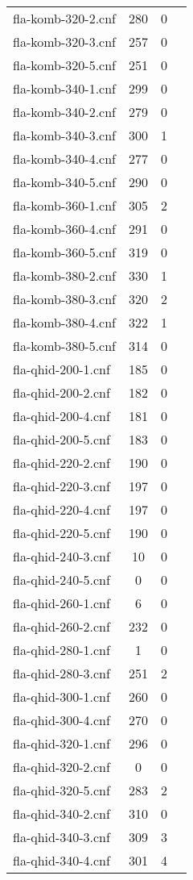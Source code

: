 \begin{table}[h!]
\begin{tabular}{l| c c c }
fla-komb-320-2.cnf & 280 & 0 \\
fla-komb-320-3.cnf & 257 & 0 \\
fla-komb-320-5.cnf & 251 & 0 \\
fla-komb-340-1.cnf & 299 & 0 \\
fla-komb-340-2.cnf & 279 & 0 \\
fla-komb-340-3.cnf & 300 & 1 \\
fla-komb-340-4.cnf & 277 & 0 \\
fla-komb-340-5.cnf & 290 & 0 \\
fla-komb-360-1.cnf & 305 & 2 \\
fla-komb-360-4.cnf & 291 & 0 \\
fla-komb-360-5.cnf & 319 & 0 \\
fla-komb-380-2.cnf & 330 & 1 \\
fla-komb-380-3.cnf & 320 & 2 \\
fla-komb-380-4.cnf & 322 & 1 \\
fla-komb-380-5.cnf & 314 & 0 \\
fla-qhid-200-1.cnf & 185 & 0 \\
fla-qhid-200-2.cnf & 182 & 0 \\
fla-qhid-200-4.cnf & 181 & 0 \\
fla-qhid-200-5.cnf & 183 & 0 \\
fla-qhid-220-2.cnf & 190 & 0 \\
fla-qhid-220-3.cnf & 197 & 0 \\
fla-qhid-220-4.cnf & 197 & 0 \\
fla-qhid-220-5.cnf & 190 & 0 \\
fla-qhid-240-3.cnf & 10 & 0 \\
fla-qhid-240-5.cnf & 0 & 0 \\
fla-qhid-260-1.cnf & 6 & 0 \\
fla-qhid-260-2.cnf & 232 & 0 \\
fla-qhid-280-1.cnf & 1 & 0 \\
fla-qhid-280-3.cnf & 251 & 2 \\
fla-qhid-300-1.cnf & 260 & 0 \\
fla-qhid-300-4.cnf & 270 & 0 \\
fla-qhid-320-1.cnf & 296 & 0 \\
\fi
fla-qhid-320-2.cnf & 0 & 0 \\
fla-qhid-320-5.cnf & 283 & 2 \\
fla-qhid-340-2.cnf & 310 & 0 \\
fla-qhid-340-3.cnf & 309 & 3 \\
fla-qhid-340-4.cnf & 301 & 4 \\

\end{tabular}
\end{table}
